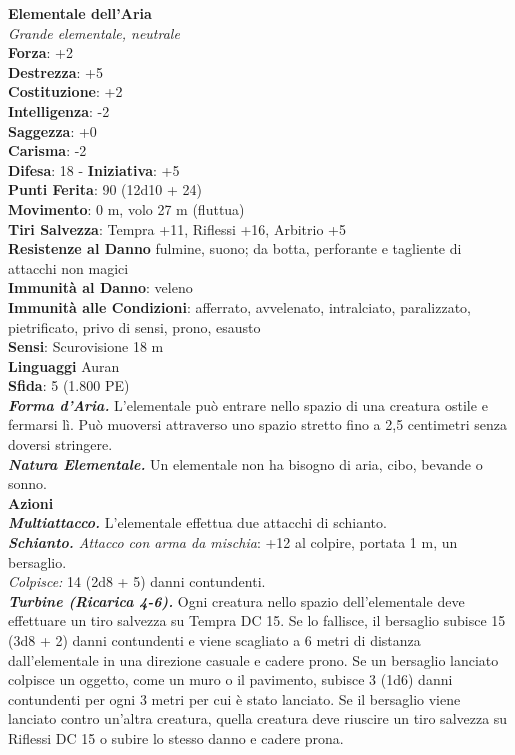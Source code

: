 \begin{multicols}{2}
\medskip\textbf{Elementale dell'Aria}\\
\emph{Grande elementale, neutrale}\\
\textbf{Forza}: +2\\
\textbf{Destrezza}: +5\\
\textbf{Costituzione}: +2\\
\textbf{Intelligenza}: -2\\
\textbf{Saggezza}: +0\\
\textbf{Carisma}: -2\\
\textbf{Difesa}: 18 - \textbf{Iniziativa}: +5\\
\textbf{Punti Ferita}: 90 (12d10 + 24)\\
\textbf{Movimento}: 0 m, volo 27 m (fluttua)\\
\textbf{Tiri Salvezza}: Tempra +11, Riflessi +16, Arbitrio +5\\
\textbf{Resistenze al Danno} fulmine, suono; da botta, perforante e tagliente di attacchi non magici\\
\textbf{Immunità al Danno}: veleno\\
\textbf{Immunità alle Condizioni}: afferrato, avvelenato, intralciato, paralizzato, pietrificato, privo di sensi, prono, esausto\\
\textbf{Sensi}: Scurovisione 18 m\\
\textbf{Linguaggi} Auran\\
\textbf{Sfida}: 5 (1.800 PE)\smallskip\\
\emph{\textbf{Forma d'Aria.}} L'elementale può entrare nello spazio di una creatura ostile e fermarsi lì. Può muoversi attraverso uno spazio stretto fino a 2,5 centimetri senza doversi stringere.\\
\emph{\textbf{Natura Elementale.}} Un elementale non ha bisogno di aria, cibo, bevande o sonno.\\
\smallskip\textbf{Azioni}\\
\emph{\textbf{Multiattacco.}} L'elementale effettua due attacchi di schianto.\\
\emph{\textbf{Schianto.} Attacco con arma da mischia}: +12 al colpire, portata 1 m, un bersaglio.\\
\emph{Colpisce:} 14 (2d8 + 5) danni contundenti.\\
\emph{\textbf{Turbine (Ricarica 4-6).}} Ogni creatura nello spazio dell'elementale deve effettuare un tiro salvezza su Tempra DC  15. Se lo fallisce, il bersaglio subisce 15 (3d8 + 2) danni contundenti e viene scagliato a 6 metri di distanza dall'elementale in una direzione casuale e cadere prono. Se un bersaglio lanciato colpisce un oggetto, come un muro o il pavimento, subisce 3 (1d6) danni contundenti per ogni 3 metri per cui è stato lanciato. Se il bersaglio viene lanciato contro un'altra creatura, quella creatura deve riuscire un tiro salvezza su Riflessi DC  15 o subire lo stesso danno e cadere prona.\\

\end{multicols}
